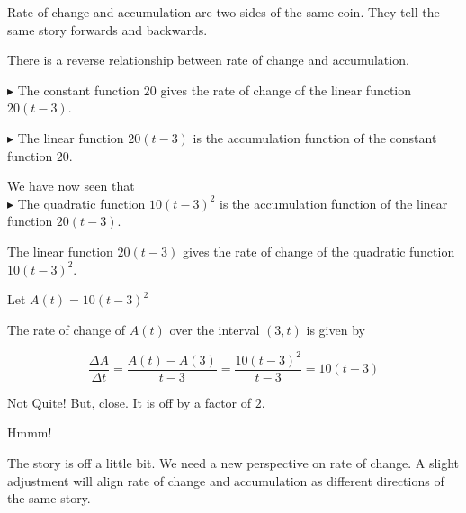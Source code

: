 \documentclass{ximera}
\begin{document}
Rate of change and accumulation are two sides of the same coin.  They tell the same story forwards and backwards.



There is a reverse relationship between rate of change and accumulation.


$\blacktriangleright$ The constant function $20$ gives the rate of change of the linear function $20(t-3)$.


$\blacktriangleright$ The linear function $20(t-3)$ is the accumulation function of the constant function $20$.




We have now seen that \\

$\blacktriangleright$ The quadratic function $10(t-3)^2$ is the accumulation function of the linear function $20(t-3)$. \\





\begin{claim}


The linear function $20(t-3)$ gives the rate of change of the quadratic function $10(t-3)^2$.



\begin{idea}


Let $A(t) = 10 (t-3)^2$


The rate of change of $A(t)$ over the interval $(3, t)$ is given by




\[
\frac{\Delta A}{\Delta t} = \frac{A(t) - A(3)}{t-3} = \frac{10 (t-3)^2}{t-3} = 10(t-3)
\]


Not Quite!  But, close.  It is off by a factor of $2$.  

\end{idea}


Hmmm!

\end{claim}














The story is off a little bit. We need a new perspective on rate of change.  A slight adjustment will align rate of change and accumulation as different directions of the same story. \\
\end{document}
